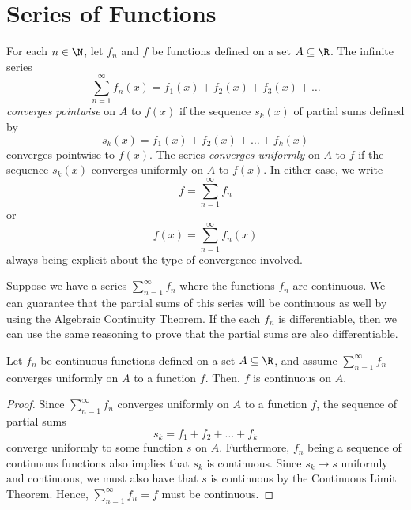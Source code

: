 \section{Series of Functions}

\begin{tcolorbox}
\begin{defn}
    For each \( n \in \N  \), let \( f_n  \) and \( f  \) be functions defined on a set \( A \subseteq \R  \). The infinite series 
    \[  \sum_{ n=1 }^{ \infty  } f_n(x) = f_1(x) + f_2(x) + f_3(x) + \dots \]
    \textit{converges pointwise}  on \( A  \) to \( f(x)  \) if the sequence \( s_k(x)  \) of partial sums defined by 
    \[  s_k(x) = f_1(x) + f_2(x) + \dots + f_k(x) \]
    converges pointwise to \( f(x)  \). The series \textit{converges uniformly} on \( A  \) to \( f  \) if the sequence \( s_k(x)  \) converges uniformly on \( A  \) to \( f(x)  \). In either case, we write 
    \[  f = \sum_{ n=1 }^{ \infty  } f_n  \] or 
    \[  f(x) = \sum_{ n=1 }^{ \infty  } f_n(x)  \] always being explicit about the type of convergence involved.
\end{defn}
\end{tcolorbox}

Suppose we have a series \( \sum_{ n=1 }^{ \infty  }f_n  \) where the functions \( f_n  \) are continuous. We can guarantee that the partial sums of this series will be continuous as well by using the Algebraic Continuity Theorem. If the each \( f_n  \) is differentiable, then we can use the same reasoning to prove that the partial sums are also differentiable.

\begin{tcolorbox}
    \begin{thm}
    Let \( f_n  \) be continuous functions defined on a set \( A \subseteq \R  \), and assume \( \sum_{ n=1 }^{ \infty  } f_n  \) converges uniformly on \( A  \) to a function \( f  \). Then, \( f  \) is continuous on \( A  \).
    \end{thm}
\end{tcolorbox}

\begin{proof}
Since \( \sum_{ n=1 }^{ \infty  } f_n  \) converges uniformly on \( A  \) to a function \( f  \), the sequence of partial sums 
\[  s_k = f_1 + f_2 + \dots + f_k \]
converge uniformly to some function \( s  \) on \( A  \). Furthermore, \( f_n \) being a sequence of continuous functions also implies that \( s_k  \) is continuous. Since \( s_k \to s  \) uniformly and continuous, we must also have that \( s  \) is continuous by the Continuous Limit Theorem. Hence, \( \sum_{ n=1 }^{ \infty  } f_n = f  \) must be continuous.
\end{proof}

